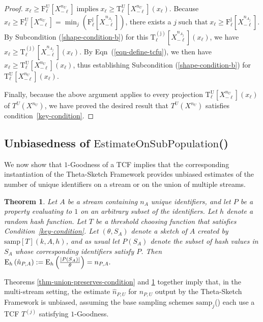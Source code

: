 \documentclass{article}
\newcommand{\tuxn}{\mathrm{T^U_\ell}[X^{n_U}_{-\ell}](x_\ell)}
\newcommand{\xon}{X^{n_{U}}}
\newcommand{\atuxn}{\mathrm{T^U_\ell}[X^{n_U}_{-\ell}](x_\ell)}
\newcommand{\atjxn}{\mathrm{T^{(j)}_\ell}[X^{n_{A_j}}_{-\ell}](x_\ell)}
\newcommand{\afuxn}{\mathrm{F^U_\ell}[X^{n_U}_{-\ell}]}
\newcommand{\afjxn}{\mathrm{F^j_\ell}[X^{n_{A_j}}_{-\ell}]}
\newcommand{\ept}{\operatornamewithlimits{E}}
\newtheorem{theorem}{Theorem}[section]
\newcommand{\romTS}{\hat{n}}
\newcommand{\estonsub}{\mathrm{EstimateOnSubPopulation}}
\newcommand{\samp}{\mathrm{samp}}
\begin{document}
\begin{proof}
\medskip
{} 
$x_\ell \ge \afuxn \; \mathrm{implies} \; x_\ell \ge \atuxn $. Because $x_\ell \ge \afuxn = \min_j (\afjxn)$,
there exists a $j \;\text{such that} \; x_\ell \ge \afjxn$. 
By Subcondition (\ref{shape-condition-b}) for this $\atjxn$, we have $x_\ell \ge \atjxn$. By
Eqn~(\ref{eqn-define-tcfu}), we then have $ x_\ell \ge \atuxn $, thus establishing
Subcondition (\ref{shape-condition-b}) for $\atuxn$. 

Finally, because the above argument applies to every
projection $\tuxn$ of $T^U(\xon)$, we have proved the desired 
result that $T^U(\xon)$ satisfies condition~\ref{key-condition}.
\end{proof}



\subsection{Unbiasedness of $\estonsub$()}\label{sec:subpop-unbiased}
We now show that $1$-Goodness of a TCF implies that the corresponding instantiation 
of the Theta-Sketch Framework provides unbiased estimates of the number of unique identifiers
on a stream or on the union of multiple streams.
\begin{theorem}\label{thm-key-property-implies-unbiased-for-single-streams} \label{thm:unbiased}
Let $A$ be a stream containing $n_A$ unique identifiers, and let $P$ be a property evaluating to $1$ on an arbitrary subset of the identifiers.
Let $h$ denote a random hash function.
Let $T$ be a threshold choosing function that satisfies Condition~\ref{key-condition}. 
Let $(\theta,S_A)$ denote a sketch of $A$ created by $\mathrm{\samp}[T](k,A,h)$,
and as usual let $P(S_A)$ denote the subset of hash values in $S_A$ whose corresponding identifiers satisfy $P$.
Then $\ept_h\left(\romTS_{P, A}\right) := \ept_h\left(
\frac{|P(S_A)|}{\theta}
\right) = n_{P, A}.$
\end{theorem}


\noindent Theorems \ref{thm-union-preserves-condition} and \ref{thm-key-property-implies-unbiased-for-single-streams}  together
imply that, in the multi-stream setting, the estimate $\romTS_{P, U}$ for $n_{P, U}$ output by the Theta-Sketch Framework is unbiased,
assuming the base sampling schemes $\samp_j$() each use a TCF $T^{(j)}$ satisfying $1$-Goodness.
\end{document}
